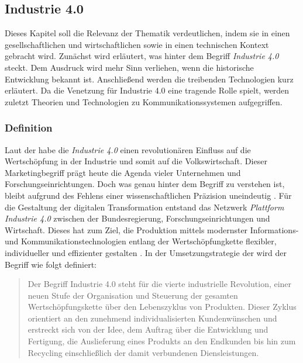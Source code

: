 \subsection{Industrie 4.0}
Dieses Kapitel soll die Relevanz der Thematik verdeutlichen, indem sie in einen gesellschaftlichen und wirtschaftlichen sowie in einen technischen Kontext gebracht wird. Zunächst wird erläutert, was hinter dem Begriff \textit{Industrie 4.0} steckt. Dem Ausdruck wird mehr Sinn verliehen, wenn die historische Entwicklung bekannt ist. Anschließend werden die treibenden Technologien kurz erläutert. Da die Venetzung für Industrie 4.0 eine tragende Rolle spielt, werden zuletzt Theorien und Technologien zu Kommunikationssystemen aufgegriffen.
\subsubsection{Definition}

Laut der \cite{FraunhoferGesellschaft2016} habe die \textit{Industrie 4.0} einen revolutionären Einfluss auf die Wertschöpfung in der Industrie und somit auf die Volkswirtschaft. Dieser Marketingbegriff prägt heute die Agenda vieler Unternehmen und Forschungseinrichtungen. Doch was genau hinter dem Begriff zu verstehen ist, bleibt aufgrund des Fehlens einer  \glqq wissenschaftlichen Präzision\grqq{} uneindeutig \citep{Bendel2019}. Für die Gestaltung der digitalen Transformation entstand das Netzwerk \textit{Plattform Industrie 4.0} zwischen der Bundesregierung, Forschungseinrichtungen und Wirtschaft. Dieses hat zum Ziel, die Produktion mittels modernster Informations- und Kommunikationstechnologien entlang der Wertschöpfungkette \glqq flexibler, individueller und effizienter\grqq{} gestalten \citep{BWE2019}. In der Umsetzungstrategie der \citet[S. 8]{BITKOM2015} wird der Begriff wie folgt definiert:

\begin{quotation} \glqq Der Begriff Industrie 4.0 steht für die vierte industrielle Revolution, einer neuen Stufe der Organisation und Steuerung der gesamten Wertschöpfungskette über den Lebenszyklus von Produkten. Dieser Zyklus orientiert an den zunehmend individualisierten Kundenwünschen und erstreckt sich von der Idee, dem Auftrag über die Entwicklung und Fertigung, die Auslieferung eines Produkts an den Endkunden bis hin zum Recycling einschließlich der damit verbundenen Diensleistungen.\grqq{}
\end{quotation}

